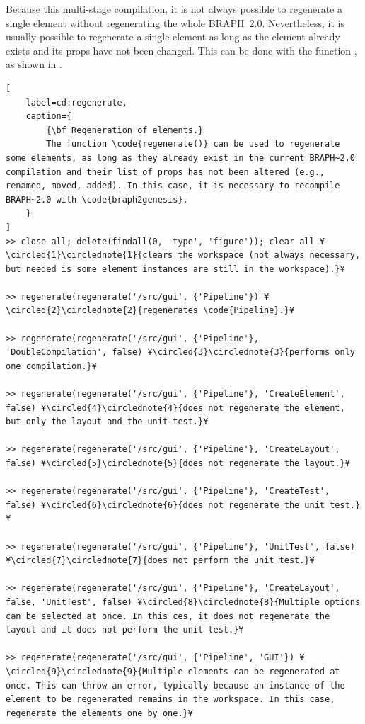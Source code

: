 \documentclass{tufte-handout}
\begin{document}
Because this multi-stage compilation, it is not always possible to regenerate a single element without regenerating the whole BRAPH~2.0. 
Nevertheless, it is usually possible to regenerate a single element as long as the element already exists and its props have not been changed.
This can be done with the function , as shown in .
%
\begin{lstlisting}[
	label=cd:regenerate,
	caption={
		{\bf Regeneration of elements.}
		The function \code{regenerate()} can be used to regenerate some elements, as long as they already exist in the current BRAPH~2.0 compilation and their list of props has not been altered (e.g., renamed, moved, added). In this case, it is necessary to recompile BRAPH~2.0 with \code{braph2genesis}.
	}
]
>> close all; delete(findall(0, 'type', 'figure')); clear all ¥\circled{1}\circlednote{1}{clears the workspace (not always necessary, but needed is some element instances are still in the workspace).}¥

>> regenerate(regenerate('/src/gui', {'Pipeline'}) ¥\circled{2}\circlednote{2}{regenerates \code{Pipeline}.}¥

>> regenerate(regenerate('/src/gui', {'Pipeline'}, 'DoubleCompilation', false) ¥\circled{3}\circlednote{3}{performs only one compilation.}¥

>> regenerate(regenerate('/src/gui', {'Pipeline'}, 'CreateElement', false) ¥\circled{4}\circlednote{4}{does not regenerate the element, but only the layout and the unit test.}¥

>> regenerate(regenerate('/src/gui', {'Pipeline'}, 'CreateLayout', false) ¥\circled{5}\circlednote{5}{does not regenerate the layout.}¥

>> regenerate(regenerate('/src/gui', {'Pipeline'}, 'CreateTest', false) ¥\circled{6}\circlednote{6}{does not regenerate the unit test.}¥

>> regenerate(regenerate('/src/gui', {'Pipeline'}, 'UnitTest', false) ¥\circled{7}\circlednote{7}{does not perform the unit test.}¥

>> regenerate(regenerate('/src/gui', {'Pipeline'}, 'CreateLayout', false, 'UnitTest', false) ¥\circled{8}\circlednote{8}{Multiple options can be selected at once. In this ces, it does not regenerate the layout and it does not perform the unit test.}¥

>> regenerate(regenerate('/src/gui', {'Pipeline', 'GUI'}) ¥\circled{9}\circlednote{9}{Multiple elements can be regenerated at once. This can throw an error, typically because an instance of the element to be regenerated remains in the workspace. In this case, regenerate the elements one by one.}¥
\end{lstlisting}
\end{document}
